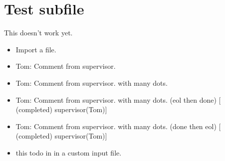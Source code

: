 \chapter{Test subfile}
\label{autosec:10}
This doesn't work yet.
    \begin{itemize}[noitemsep]
        \item {\color{red}Import a file.}
        \item {\color{WildStrawberry}Tom: Comment from supervisor.}
        \item {\color{WildStrawberry}Tom: Comment from supervisor. with many dots.}
        \item {\color{Gray}Tom: Comment from supervisor. with many dots. (eol then done) [ (completed) supervisor(Tom)]}
        \item {\color{Gray}Tom: Comment from supervisor. with many dots. (done then eol) [ (completed) supervisor(Tom)]}
        \item {\color{red}this todo in in a custom input file.}
    \end{itemize}


